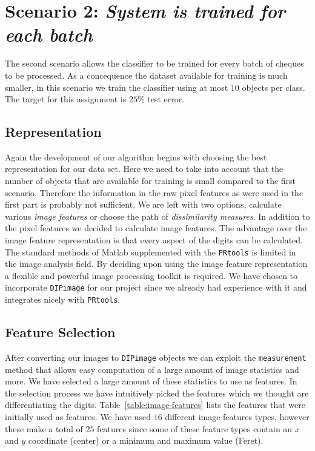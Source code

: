 \documentclass{article}
\begin{document}
\section{Scenario 2: \textit{System is trained for each batch}}

The second scenario allows the classifier to be trained for every batch of cheques to be processed. As a concequence the dataset available for training is much smaller, in this scenario we train the classifier using at most $10$ objects per class. The target for this assignment is $25\%$ test error.

\subsection{Representation}
Again the development of our algorithm begins with choosing the best representation for our data set. Here we need to take into account that the number of objects that are available for training is small compared to the first scenario. Therefore the information in the raw pixel features as were used in the first part is probably not sufficient. We are left with two options, calculate various \emph{image features} or choose the path of \emph{dissimilarity measures}. In addition to the pixel features we decided to calculate image features. The advantage over the image feature representation is that every aspect of the digits can be calculated. \\

The standard methods of Matlab supplemented with the \texttt{PRtools} is limited in the image analysis field. By deciding upon using the image feature representation a flexible and powerful image processing toolkit is required. We have chosen to incorporate \texttt{DIPimage} for our project since we already had experience with it and integrates nicely with \texttt{PRtools}.

\subsection{Feature Selection}

After converting our images to \texttt{DIPimage} objects we can exploit the \texttt{measurement} method that allows easy computation of a large amount of image statistics and more. We have selected a large amount of these statistics to use as features. In the selection process we have intuitively picked the features which we thought are differentiating the digits. Table~\ref{table:image-features} lists the features that were initially used as features. We have used $16$ different image features types, however these make a total of $25$ features since some of these feature types contain an $x$ and $y$ coordinate (center) or a minimum and maximum value (Feret).
\end{document}
